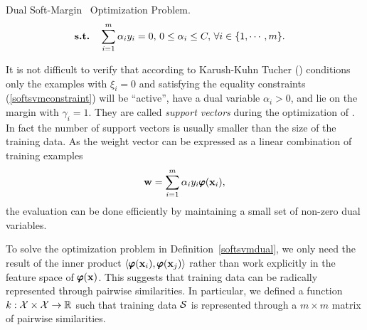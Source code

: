 {\begin{definition}{Dual Soft-Margin \svm\ Optimization Problem.}
\begin{align*}
		\textbf{s.t.} & \quad \sum_{i=1}^{m}\alpha_iy_i=0, \, 0\le\alpha_i\le C, \, \forall i\in\{1,\cdots,m\}.
	\end{align*}
\end{definition}
\noindent
It is not difficult to verify that according to Karush-Kuhn Tucher (\kkt) conditions only the examples with $\xi_i=0$ and satisfying the equality constraints (\ref{softsvmconstraint}) will be ``active'', have a dual variable $\alpha_i>0$, and lie on the margin with $\gamma_i=1$.
They are called \textit{support vectors} during the optimization of \svm.
In fact the number of support vectors is usually smaller than the size of the training data.
As the weight vector can be expressed as a linear combination of training examples \citep{Taylor04kernel}
\begin{align*}
	\mathbf {w} = \sum_{i=1}^{m}\alpha_iy_i\pmb \varphi(\mathbf {x}_i),
\end{align*}
the evaluation can be done efficiently by maintaining a small set of non-zero dual variables.

To solve the optimization problem in Definition~\ref{softsvmdual}, we only need the result of the inner product $\langle \pmb \varphi(\mathbf {x}_i), \pmb \varphi(\mathbf {x}_j) \rangle$ rather than work explicitly in the feature space of $\pmb \varphi(\mathbf {x})$.
This suggests that training data can be radically represented through pairwise similarities.
In particular, we defined a function $k:\mathcal{X}\times\mathcal{X}\rightarrow\mathbb{R}$ such that training data $\mathcal{S}$ is represented through a $m\times m$ matrix of pairwise similarities.

}
